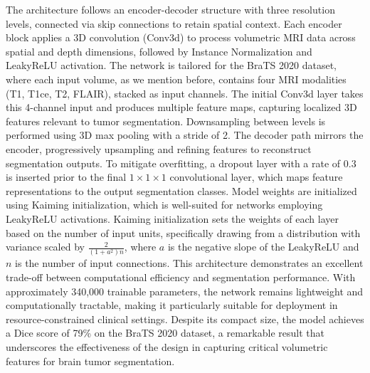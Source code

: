 \documentclass[10pt,twocolumn,letterpaper]{article}
\begin{document}
The architecture follows an encoder-decoder structure with three resolution levels, 
connected via skip connections to retain spatial context. Each encoder block applies a 3D convolution (Conv3d) to process volumetric MRI data across spatial and depth dimensions, 
followed by Instance Normalization and LeakyReLU activation. 
The network is tailored for the BraTS 2020 dataset, where each input volume, as we mention before, contains four MRI modalities (T1, T1ce, T2, FLAIR), stacked as input channels. 
The initial Conv3d layer takes this 4-channel input and produces multiple feature maps, capturing localized 3D features relevant to tumor segmentation. 
Downsampling between levels is performed using 3D max pooling with a stride of 2. The decoder path mirrors the encoder, progressively upsampling and refining features to reconstruct segmentation outputs.
To mitigate overfitting, a dropout layer with a rate of $0.3$ is inserted prior to the final $1\times1\times1$ convolutional layer, which maps feature representations to the output segmentation classes. 
Model weights are initialized using Kaiming initialization, which is well-suited for networks employing LeakyReLU activations. 
Kaiming initialization \cite{He_2015_ICCV} sets the weights of each layer based on the number of input units, specifically drawing from a distribution with variance scaled by $\frac{2}{(1 + a^2)n}$, where $a$ is the negative slope of the LeakyReLU and $n$ is the number of input connections.  
This architecture demonstrates an excellent trade-off between computational efficiency and segmentation performance. With approximately 340,000 trainable parameters, the network remains lightweight and computationally tractable, making it particularly suitable for deployment in resource-constrained clinical settings. Despite its compact size, the model achieves a Dice score of 79\% on the BraTS 2020 dataset, a remarkable result that underscores the effectiveness of the design in capturing critical volumetric features for brain tumor segmentation.
\end{document}
